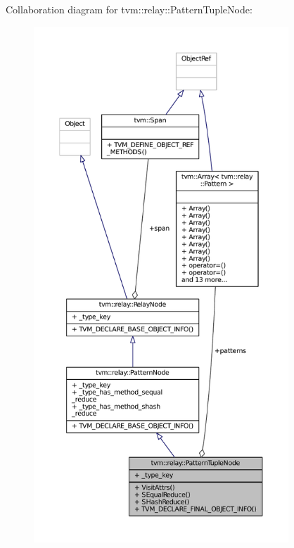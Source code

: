 Collaboration diagram for tvm\+:\+:relay\+:\+:Pattern\+Tuple\+Node\+:
\nopagebreak
\begin{figure}[H]
\begin{center}
\leavevmode
\includegraphics[height=550pt]{classtvm_1_1relay_1_1PatternTupleNode__coll__graph}
\end{center}
\end{figure}
